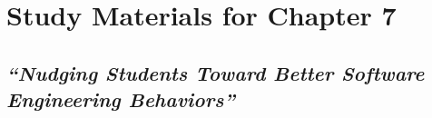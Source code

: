 \chapter{Study Materials for Chapter 7}
\label{app-bot}

\section{\em ``Nudging Students Toward Better Software Engineering Behaviors''}


